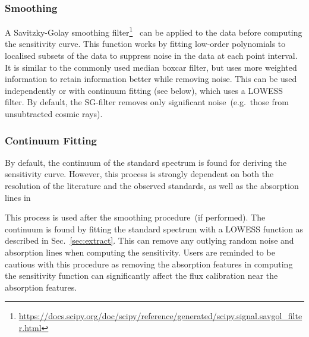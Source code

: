 \documentclass[twocolumn, linenumbers]{aastex631}
\begin{document}
\subsubsection*{Smoothing}
A Savitzky-Golay smoothing
filter\footnote{\url{https://docs.scipy.org/doc/scipy/reference/generated/scipy.signal.savgol_filter.html}}~\citep[hereafter, SG-filter]{1964AnaCh..36.1627S}
can be applied to the data before computing the sensitivity curve. This function
works by fitting low-order polynomials to localised subsets of the data to
suppress noise in the data at each point interval. It is similar to the
commonly used median boxcar filter, but uses more weighted information to
retain information better while removing noise. This can be used independently
or with continuum fitting (see below), which uses a LOWESS filter. By default,
the SG-filter removes only significant noise~(e.g.\ those from unsubtracted
cosmic rays).

\subsubsection*{Continuum Fitting}
By default, the continuum of the standard spectrum is found for deriving the
sensitivity curve. However, this process is strongly dependent on both the
resolution of the literature and the observed standards, as well as the
absorption lines in 

This process is used after the smoothing procedure~(if performed). The continuum
is found by fitting the standard spectrum with a LOWESS function as described in
Sec.~\ref{sec:extract}. This can remove any outlying random noise and absorption
lines when computing the sensitivity. Users are reminded to be cautious with
this procedure as removing the absorption features in computing the sensitivity
function can significantly affect the flux calibration near the absorption
features.

\end{document}
